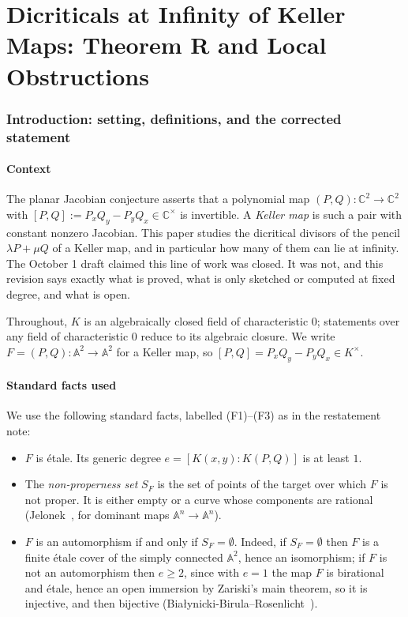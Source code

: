 \documentclass[a4paper,11pt]{article}
\theoremstyle{plain}
\theoremstyle{definition}
\theoremstyle{remark}
\begin{document}
\part{\texorpdfstring{Dicriticals at Infinity of Keller Maps: Theorem R and Local Obstructions}{Dicriticals at Infinity of Keller Maps: Theorem R and Local Obstructions}}

\section{Introduction: setting, definitions, and the corrected statement}\label{td:sec:statement}

\subsection{Context}

The planar Jacobian conjecture asserts that a polynomial map
$(P,Q) \colon \mathbb{C}^2 \to \mathbb{C}^2$ with
$[P,Q] := P_x Q_y - P_y Q_x \in \mathbb{C}^\times$ is invertible. A \emph{Keller map} is
such a pair with constant nonzero Jacobian. This paper studies the dicritical divisors of the
pencil $\lambda P + \mu Q$ of a Keller map, and in particular how many of them can lie at
infinity. The October 1 draft claimed this line of work was closed. It was not, and this
revision says exactly what is proved, what is only sketched or computed at fixed degree, and
what is open.

Throughout, $K$ is an algebraically closed field of characteristic $0$; statements over any
field of characteristic $0$ reduce to its algebraic closure. We write
$F = (P,Q) \colon \mathbb{A}^2 \to \mathbb{A}^2$ for a Keller map, so
$[P,Q] = P_x Q_y - P_y Q_x \in K^\times$.

\subsection{Standard facts used}

We use the following standard facts, labelled (F1)--(F3) as in the restatement note:
\begin{itemize}[nosep]
\item[(F1)] $F$ is \'{e}tale. Its generic degree $e = [K(x,y) : K(P,Q)]$ is at least $1$.
\item[(F2)] The \emph{non-properness set} $S_F$ is the set of points of the target over which
$F$ is not proper. It is either empty or a curve whose components are rational
(Jelonek~\cite{Jelonek1993}, for dominant maps $\mathbb{A}^n \to \mathbb{A}^n$).
\item[(F3)] $F$ is an automorphism if and only if $S_F = \emptyset$. Indeed, if
$S_F = \emptyset$ then $F$ is a finite \'{e}tale cover of the simply connected
$\mathbb{A}^2$, hence an isomorphism; if $F$ is not an automorphism then $e \geq 2$, since
with $e = 1$ the map $F$ is birational and \'{e}tale, hence an open immersion by Zariski's
main theorem, so it is injective, and then bijective
(Bia\l{}ynicki-Birula--Rosenlicht~\cite{BBR1962}).
\end{itemize}
\end{document}
